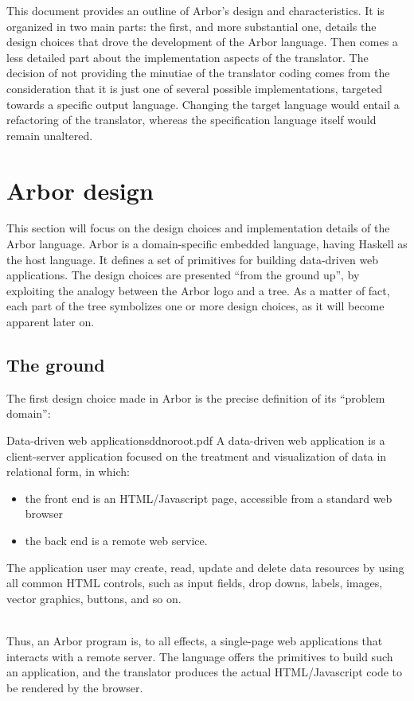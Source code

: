 \documentclass[12pt]{article} %
\newcommand{\ddwa}{data-driven web application}
\newcommand{\Ddwa}{Data-driven web application}
\newcommand{\be}{back end}
\newcommand{\fe}{front end}
\newcommand{\dsel}{domain-specific embedded language}
\newcommand{\A}{Arbor}
\newcommand{\Hs}{Haskell}
\newcommand{\q}[1]{``#1''}
\begin{document}
This document provides an outline of \A{}'s design and characteristics. It is organized in two main parts: the first, and more substantial one, details the design choices that drove the development of the \A{} language. Then comes a less detailed part about the implementation aspects of the translator. The decision of not providing the minutiae of the translator coding comes from the consideration that it is just one of several possible implementations, targeted towards a specific output language. Changing the target language would entail a refactoring of the translator, whereas the specification language itself would remain unaltered.

\section{\A{} design}\label{design}
This section will focus on the design choices and implementation details of the \A{} language. \A{} is a \dsel{}, having \Hs{} as the host language. It defines a set of primitives for building \ddwa{}s.
The design choices are presented \q{from the ground up}, by exploiting the analogy between the \A{} logo and a tree. As a matter of fact, each part of the tree symbolizes one or more design choices, as it will become apparent later on.

\subsection{The ground}\label{ground}
The first design choice made in \A{} is the precise definition of its \q{problem domain}:
\begin{dce}{\Ddwa{}s}{dd}{noroot.pdf}
A \ddwa{} is a client-server application focused on the treatment and visualization of data in relational form, in which:
\begin{itemize}
\item the \fe{} is an HTML/Javascript page, accessible from a standard web browser 
\item the \be{} is a remote web service. 
\end{itemize}
The application user may create, read, update and delete data resources by using all common HTML controls, such as input fields, drop downs, labels, images, vector graphics, buttons, and so on.
\end{dce}
~\\
Thus, an \A{} program is, to all effects, a single-page web applications that interacts with a remote server. The language offers the primitives to build such an application, and the translator produces the actual HTML/Javascript code to be rendered by the browser.
\end{document}
